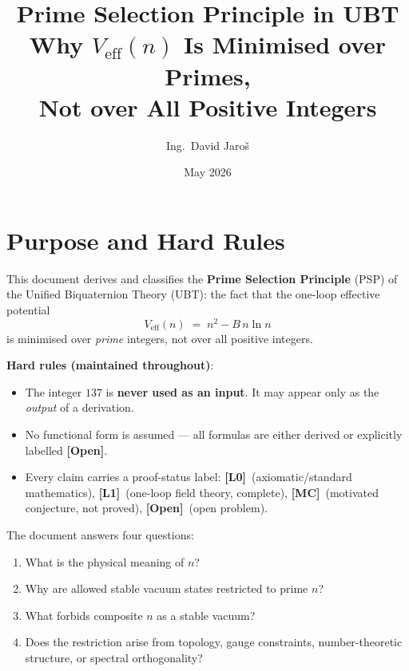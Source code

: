 \documentclass[12pt,a4paper]{article}
\title{\textbf{Prime Selection Principle in UBT}\\[6pt]
         \large Why $V_{\mathrm{eff}}(n)$ Is Minimised over Primes,\\
         Not over All Positive Integers}
\author{Ing.\ David Jaro\v{s}}
\date{May 2026}
\theoremstyle{definition}
\theoremstyle{remark}
\newcommand{\OPEN}{\textbf{[Open]}}
\newcommand{\MC}{\textbf{[MC]}}
\newcommand{\Lone}{\textbf{[L1]}}
\newcommand{\Lzero}{\textbf{[L0]}}
\begin{document}
  \maketitle
  \tableofcontents
  \newpage
\fi

\section{Purpose and Hard Rules}
\label{sec:psp:purpose}

This document derives and classifies the \textbf{Prime Selection Principle}
(PSP) of the Unified Biquaternion Theory (UBT): the fact that the one-loop
effective potential
\begin{equation}
  V_{\mathrm{eff}}(n) \;=\; n^2 - B\,n\ln n
  \label{eq:psp:Veff}
\end{equation}
is minimised over \emph{prime} integers, not over all positive integers.

\begin{warnbox}
\textbf{Hard rules (maintained throughout)}:
\begin{itemize}
  \item The integer $137$ is \textbf{never used as an input}.  It may appear
        only as the \emph{output} of a derivation.
  \item No functional form is assumed — all formulas are either derived or
        explicitly labelled \OPEN.
  \item Every claim carries a proof-status label:
        \Lzero\ (axiomatic/standard mathematics),
        \Lone\ (one-loop field theory, complete),
        \MC\ (motivated conjecture, not proved),
        \OPEN\ (open problem).
\end{itemize}
\end{warnbox}

\noindent The document answers four questions:
\begin{enumerate}
  \item[(Q1)] What is the physical meaning of $n$?
  \item[(Q2)] Why are allowed stable vacuum states restricted to prime $n$?
  \item[(Q3)] What forbids composite $n$ as a stable vacuum?
  \item[(Q4)] Does the restriction arise from
              topology, gauge constraints, number-theoretic structure,
              or spectral orthogonality?
\end{enumerate}
\end{document}
